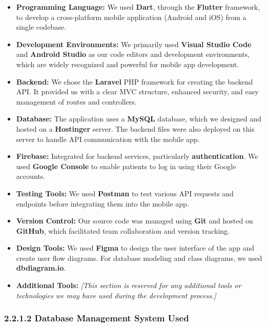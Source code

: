\documentclass[12pt]{report}
\begin{document}
\begin{itemize}
    \item \textbf{Programming Language:} We used \textbf{Dart}, through the \textbf{Flutter} framework, to develop a cross-platform mobile application (Android and iOS) from a single codebase.

    \item \textbf{Development Environments:} We primarily used \textbf{Visual Studio Code} and \textbf{Android Studio} as our code editors and development environments, which are widely recognized and powerful for mobile app development.

    \item \textbf{Backend:} We chose the \textbf{Laravel} PHP framework for creating the backend API. It provided us with a clear MVC structure, enhanced security, and easy management of routes and controllers.

    \item \textbf{Database:} The application uses a \textbf{MySQL} database, which we designed and hosted on a \textbf{Hostinger} server. The backend files were also deployed on this server to handle API communication with the mobile app.

    \item \textbf{Firebase:} Integrated for backend services, particularly \textbf{authentication}. We used \textbf{Google Console} to enable patients to log in using their Google accounts.

    \item \textbf{Testing Tools:} We used \textbf{Postman} to test various API requests and endpoints before integrating them into the mobile app.

    \item \textbf{Version Control:} Our source code was managed using \textbf{Git} and hosted on \textbf{GitHub}, which facilitated team collaboration and version tracking.

    \item \textbf{Design Tools:} We used \textbf{Figma} to design the user interface of the app and create user flow diagrams. For database modeling and class diagrams, we used \textbf{dbdiagram.io}.

    \item \textbf{Additional Tools:} \textit{[This section is reserved for any additional tools or technologies we may have used during the development process.]}
\end{itemize}

\subsubsection*{2.2.1.2 Database Management System Used}
\end{document}
